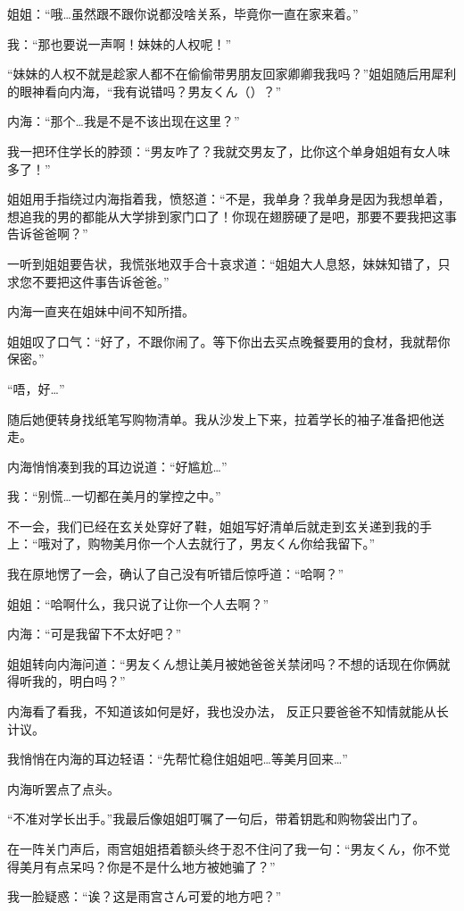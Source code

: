 姐姐：“哦…虽然跟不跟你说都没啥关系，毕竟你一直在家来着。”

我：“那也要说一声啊！妹妹的人权呢！”

“妹妹的人权不就是趁家人都不在偷偷带男朋友回家卿卿我我吗？”姐姐随后用犀利的眼神看向内海，“我有说错吗？男友くん（）？”

内海：“那个…我是不是不该出现在这里？”

我一把环住学长的脖颈：“男友咋了？我就交男友了，比你这个单身姐姐有女人味多了！”

姐姐用手指绕过内海指着我，愤怒道：“不是，我单身？我单身是因为我想单着，想追我的男的都能从大学排到家门口了！你现在翅膀硬了是吧，那要不要我把这事告诉爸爸啊？”

一听到姐姐要告状，我慌张地双手合十哀求道：“姐姐大人息怒，妹妹知错了，只求您不要把这件事告诉爸爸。”

内海一直夹在姐妹中间不知所措。

姐姐叹了口气：“好了，不跟你闹了。等下你出去买点晚餐要用的食材，我就帮你保密。”　　

“唔，好…”

随后她便转身找纸笔写购物清单。我从沙发上下来，拉着学长的袖子准备把他送走。

内海悄悄凑到我的耳边说道：“好尴尬…”

我：“别慌…一切都在美月的掌控之中。”

不一会，我们已经在玄关处穿好了鞋，姐姐写好清单后就走到玄关递到我的手上：“哦对了，购物美月你一个人去就行了，男友くん你给我留下。”

我在原地愣了一会，确认了自己没有听错后惊呼道：“哈啊？”

姐姐：“哈啊什么，我只说了让你一个人去啊？”

内海：“可是我留下不太好吧？”

姐姐转向内海问道：“男友くん想让美月被她爸爸关禁闭吗？不想的话现在你俩就得听我的，明白吗？”

内海看了看我，不知道该如何是好，我也没办法， 反正只要爸爸不知情就能从长计议。

我悄悄在内海的耳边轻语：“先帮忙稳住姐姐吧…等美月回来…”

内海听罢点了点头。

“不准对学长出手。”我最后像姐姐叮嘱了一句后，带着钥匙和购物袋出门了。


在一阵关门声后，雨宫姐姐捂着额头终于忍不住问了我一句：“男友くん，你不觉得美月有点呆吗？你是不是什么地方被她骗了？”

我一脸疑惑：“诶？这是雨宫さん可爱的地方吧？”

